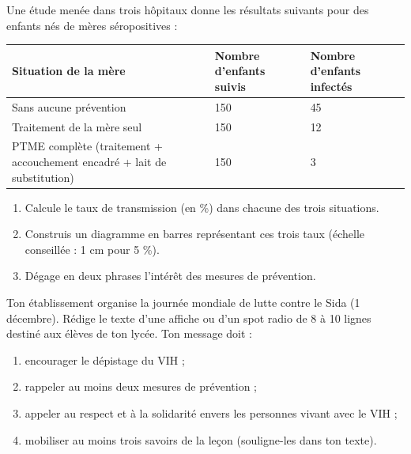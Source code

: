 \documentclass[11pt]{article}
\newcounter{popsec}
\newcounter{popsub}
\newcommand{\courssub}[1]{%
  \stepcounter{popsub}%
  \par\vspace{9pt}\noindent{\popxbold\fontsize{11.5}{13}\selectfont\color{popink}{\color{poporange}\thepopsec.\thepopsub}\hspace{6pt}#1}\par\nopagebreak\vspace{4pt}
}
\begin{document}
\begin{exercice}
Une étude menée dans trois hôpitaux donne les résultats suivants pour des enfants nés de mères séropositives :

\begin{center}
\begin{tabularx}{\linewidth}{|l|X|X|}\hline
\rowcolor{popblueL} \textbf{Situation de la mère} & \textbf{Nombre d'enfants suivis} & \textbf{Nombre d'enfants infectés} \\ \hline
Sans aucune prévention & 150 & 45 \\ \hline
Traitement de la mère seul & 150 & 12 \\ \hline
PTME complète (traitement + accouchement encadré + lait de substitution) & 150 & 3 \\ \hline
\end{tabularx}
\end{center}

\begin{enumerate}
\item Calcule le taux de transmission (en \%) dans chacune des trois situations.
\item Construis un diagramme en barres représentant ces trois taux (échelle conseillée : 1 cm pour 5 \%).
\item Dégage en deux phrases l'intérêt des mesures de prévention.
\end{enumerate}
\end{exercice}

\begin{exercice}
Ton établissement organise la journée mondiale de lutte contre le Sida (1\ier{} décembre). Rédige le texte d'une affiche ou d'un spot radio de 8 à 10 lignes destiné aux élèves de ton lycée. Ton message doit :
\begin{enumerate}
\item encourager le dépistage du VIH ;
\item rappeler au moins deux mesures de prévention ;
\item appeler au respect et à la solidarité envers les personnes vivant avec le VIH ;
\item mobiliser au moins trois savoirs de la leçon (souligne-les dans ton texte).
\end{enumerate}
\end{exercice}

\courssub{Je me prépare au Bac}
\end{document}
